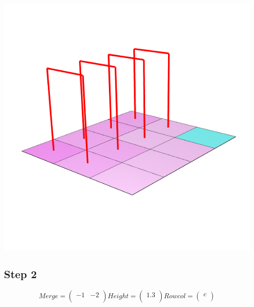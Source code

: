 \documentclass{article}
\begin{document}
\centering \includegraphics[scale=0.3]{Merge1}

\raggedright\subsection{Step 2}
\[
Merge =  \left(\begin{array}{cc}
-1 & -2 \\
\end{array} \right)
%
Height = \left( \begin{array}{c}
1.3 \\
\end{array} \right)
%
Rowcol = \left( \begin{array}{c}
c \\
\end{array} \right)
\]  
\end{document}
